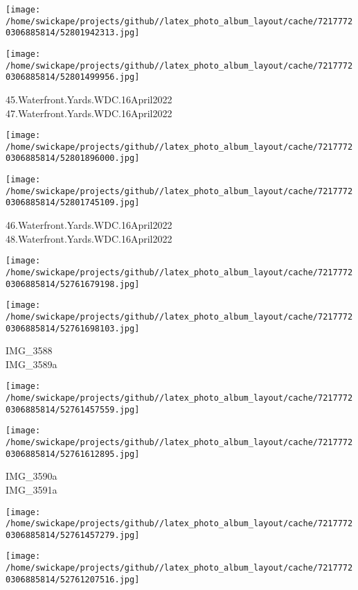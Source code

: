 \documentclass[10pt,letterpaper]{article}
\begin{document}
\texttt{[image: /home/swickape/projects/github//latex\_photo\_album\_layout/cache/72177720306885814/52801942313.jpg]}

\vspace{0.25in}
\texttt{[image: /home/swickape/projects/github//latex\_photo\_album\_layout/cache/72177720306885814/52801499956.jpg]}

45.Waterfront.Yards.WDC.16April2022\\
47.Waterfront.Yards.WDC.16April2022
\pagebreak

\texttt{[image: /home/swickape/projects/github//latex\_photo\_album\_layout/cache/72177720306885814/52801896000.jpg]}

\vspace{0.25in}
\texttt{[image: /home/swickape/projects/github//latex\_photo\_album\_layout/cache/72177720306885814/52801745109.jpg]}

46.Waterfront.Yards.WDC.16April2022\\
48.Waterfront.Yards.WDC.16April2022
\pagebreak

\texttt{[image: /home/swickape/projects/github//latex\_photo\_album\_layout/cache/72177720306885814/52761679198.jpg]}

\vspace{0.25in}
\texttt{[image: /home/swickape/projects/github//latex\_photo\_album\_layout/cache/72177720306885814/52761698103.jpg]}

IMG\_3588\\
IMG\_3589a
\pagebreak

\texttt{[image: /home/swickape/projects/github//latex\_photo\_album\_layout/cache/72177720306885814/52761457559.jpg]}

\vspace{0.25in}
\texttt{[image: /home/swickape/projects/github//latex\_photo\_album\_layout/cache/72177720306885814/52761612895.jpg]}

IMG\_3590a\\
IMG\_3591a
\pagebreak

\texttt{[image: /home/swickape/projects/github//latex\_photo\_album\_layout/cache/72177720306885814/52761457279.jpg]}

\vspace{0.25in}
\texttt{[image: /home/swickape/projects/github//latex\_photo\_album\_layout/cache/72177720306885814/52761207516.jpg]}
\end{document}
